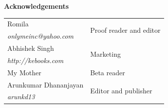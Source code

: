\vfill

\textbf{Acknowledgements}

\footnotesize
\begin{tabular}{ll}
    Romila & \multirow{2}{*}{Proof reader and editor} \\
    \emph{onlymeinc@yahoo.com} & \\
    Abhishek Singh & \multirow{2}{*}{Marketing} \\
    \emph{http://kebooks.com} & \\
    My Mother & Beta reader \\
    Arunkumar Dhananjayan & \multirow{2}{*}{Editor and publisher} \\
    \emph{arunkd13} & \\
\end{tabular}

\clearpage